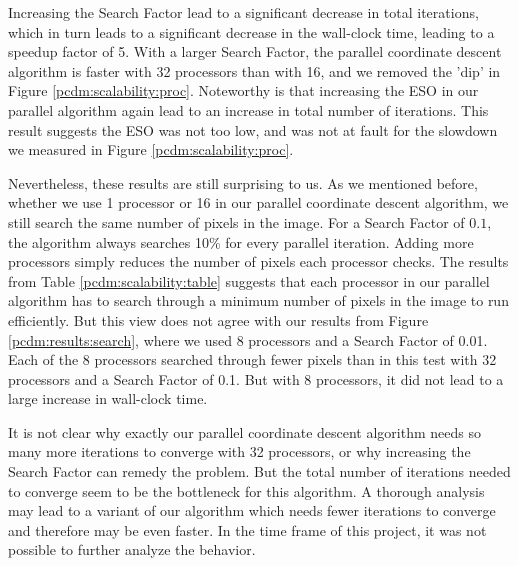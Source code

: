 Increasing the Search Factor lead to a significant decrease in total iterations, which in turn leads to a significant decrease in the wall-clock time, leading to a speedup factor of 5. With a larger Search Factor, the parallel coordinate descent algorithm is faster with 32 processors than with 16, and we removed the 'dip' in Figure \ref{pcdm:scalability:proc}. Noteworthy is that increasing the ESO in our parallel algorithm again lead to an increase in total number of iterations. This result suggests the ESO was not too low, and was not at fault for the slowdown we measured in Figure \ref{pcdm:scalability:proc}.

Nevertheless, these results are still surprising to us. As we mentioned before, whether we use 1 processor or 16 in our parallel coordinate descent algorithm, we still search the same number of pixels in the image. For a Search Factor of $0.1$, the algorithm always searches 10\% for every parallel iteration. Adding more processors simply reduces the number of pixels each processor checks. The results from Table \ref{pcdm:scalability:table} suggests that each processor in our parallel algorithm has to search through a minimum number of pixels in the image to run efficiently. But this view does not agree with our results from Figure \ref{pcdm:results:search}, where we used 8 processors and a Search Factor of 0.01. Each of the 8 processors searched through fewer pixels than in this test with 32 processors and a Search Factor of 0.1. But with 8 processors, it did not lead to a large increase in wall-clock time.

It is not clear why exactly our parallel coordinate descent algorithm needs so many more iterations to converge with 32 processors, or why increasing the Search Factor can remedy the problem. But the total number of iterations needed to converge seem to be the bottleneck for this algorithm. A thorough analysis may lead to a variant of our algorithm which needs fewer iterations to converge and therefore may be even faster. In the time frame of this project, it was not possible to further analyze the behavior.
